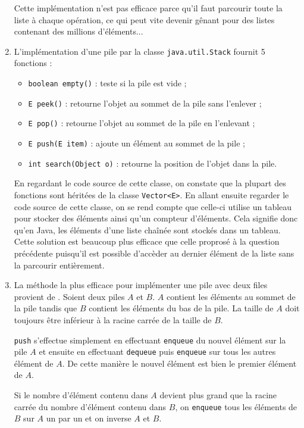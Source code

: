\begin{enumerate}
	Cette implémentation n'est pas efficace parce qu'il
	faut parcourir toute la liste à chaque opération, ce
	qui peut vite devenir gênant pour des listes contenant
	des millions d'éléments...
	\item L'implémentation d'une pile par la classe
	\lstinline{java.util.Stack}\lstinline{} fournit 5
	fonctions :
	\begin{itemize}
		\item \lstinline{boolean empty()}\lstinline{} :
		teste si la pile est vide ;	
		\item \lstinline{E peek()}\lstinline{} : retourne
		l'objet au sommet de la pile sans l'enlever ;
		\item \lstinline{E pop()}\lstinline{} : retourne
		l'objet au sommet de la pile en l'enlevant ;
		\item \lstinline{E push(E item)}\lstinline{} :
		ajoute un élément au sommet de la pile ;
		\item \lstinline{int search(Object o)}\lstinline{} :
		retourne la position de l'objet dans la pile.
	\end{itemize}
	
	En regardant le code source de cette classe, on
	constate que la plupart des fonctions sont héritées
	de la classe \lstinline{Vector<E>}\lstinline{}. En
	allant ensuite regarder le code source de cette classe,
	on se rend compte que celle-ci utilise un tableau pour
	stocker des éléments ainsi qu'un compteur d'éléments. 
	Cela signifie donc qu'en Java, les éléments d'une liste
	chaînée sont stockés dans un tableau. Cette solution
	est beaucoup plus efficace que celle proprosé à la
	question précédente puisqu'il est possible d'accèder au
	dernier élément de la liste sans la parcourir entièrement.
	\item La méthode la plus efficace pour implémenter
	une pile avec deux files provient de \cite{stack1}.
	Soient deux piles $A$ et $B$. $A$ contient les
	éléments au sommet de la pile tandis que $B$
	contient les éléments du bas de la pile. La taille
	de $A$ doit toujours être inférieur à la
	racine carrée de la taille de $B$.
	
	\lstinline{push}\lstinline{} s'effectue simplement
	en effectuant \lstinline{enqueue}\lstinline{} 
	du nouvel élément sur la pile $A$ et ensuite en
	effectuant \lstinline{dequeue}\lstinline{} puis
	\lstinline{enqueue}\lstinline{} sur tous les autres
	élément de $A$. De cette manière le nouvel élément
	est bien le premier élément de $A$.
	
	Si le nombre d'élément contenu dans $A$ devient
	plus grand que la racine carrée du nombre
	d'élément contenu dans $B$, on
	\lstinline{enqueue}\lstinline{} tous les éléments
	de $B$ sur $A$ un par un et on inverse $A$ et $B$.
	

\end{enumerate}
